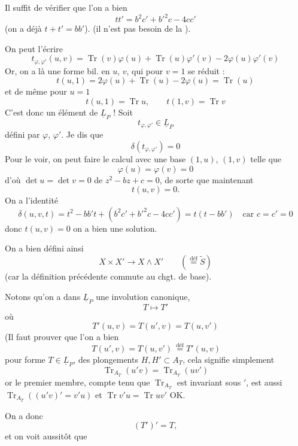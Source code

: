 \documentclass[11pt,a4paper]{article}
\begin{document}
Il suffit de vérifier que l'on a bien
\[ tt' = b^2c' + b'^2c - 4cc' \]
(on a déjà $t+t'=bb'$).   (il n'est pas besoin de la ).

On peut l'écrire
\[ \boxed{\, t_{\varphi,\varphi'}(u,v) = \operatorname{Tr}(v)\varphi(u) + \operatorname{Tr}(u)\varphi'(v) - 2\varphi(u)\varphi'(v) \,} \]
Or, on a là une forme bil. en $u$, $v$, qui pour $v=1$ se réduit :
\[ t(u,1) = 2\varphi(u) + \operatorname{Tr}(u) - 2\varphi(u) = \operatorname{Tr}(u) \]
et de même pour $u=1$ \struck{\ill{}}
\[ t(u,1) = \operatorname{Tr} u , \qquad t(1,v) = \operatorname{Tr} v \]
C'est donc un élément de $\underline{L}_P$ ! Soit
\[ t_{\varphi,\varphi'} \in \underline{L}_P \]
 défini par $\varphi$, $\varphi'$. Je dis que
\[ \delta(t_{\varphi,\varphi'}) = 0 \]
Pour le voir, on peut faire le calcul avec une base  $(1,u)$, $(1,v)$ telle que
\[ \varphi(u) = \varphi(v) = 0 \]
d'où $\det u = \det v = 0$  \struck{\ill{}} de $z^2-bz+c=0$, de sorte que maintenant
\[ t(u,v) = 0 . \]
 On a l'identité
\[ \delta(u,v,t) = t^2 - bb't + (b^2c' + b'^2c - 4cc') = t(t-bb') \quad \text{car } c=c'=0 \]
donc  $t(u,v)=0$ on a bien une solution.

 On a bien défini ainsi
\[ X\times X' \longrightarrow X\wedge X' \qquad (\overset{\text{déf}}{=} \tilde{S}) \]
(car la définition précédente commute au chgt. de base).

Notons qu'on a dans $\underline{L}_P$ une involution canonique,
\[ T \longmapsto T' \]
où
\[ T'(u,v) = T(u',v) = T(u,v') \]
(Il faut prouver que l'on a bien
\[ \boxed{\, T(u',v) = T(u,v') \,} \overset{\text{déf}}{=} T'(u,v) \]
pour  forme $T\in\underline{L}_P$,   des plongements $H,H'\subset A_T$, cela signifie simplement
\[ \operatorname{Tr}_{A_T}(u'v) = \operatorname{Tr}_{A_T}(uv') \]
or le premier membre, compte tenu que $\operatorname{Tr}_{A_T}$ est invariant sous $'$, est aussi $\operatorname{Tr}_{A_T}((u'v)'=v'u)$ et $\operatorname{Tr} v'u = \operatorname{Tr} uv'$ OK.

On a donc
\[ (T')' = T , \]
et on voit aussitôt que
\end{document}
